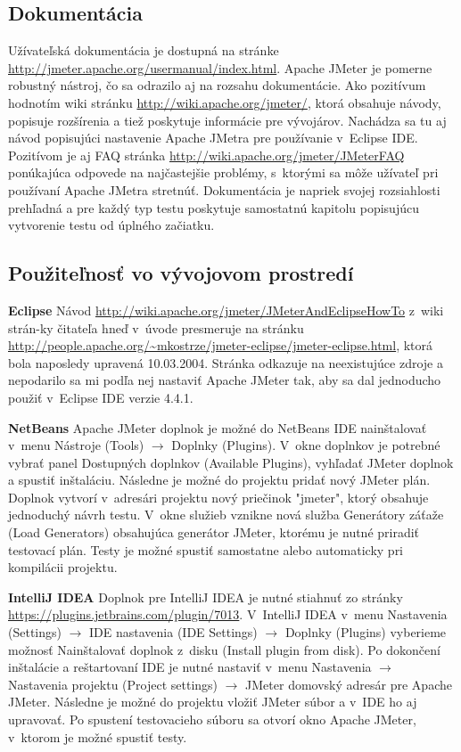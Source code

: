 \documentclass[12pt,oneside,final]{fithesis-utf8}
\begin{document}
\subsection{Dokumentácia}
Užívateľská dokumentácia je dostupná na stránke \url{http://jmeter.apache.org/usermanual/index.html}. Apache JMeter je pomerne robustný nástroj, čo sa odrazilo aj na rozsahu dokumentácie. Ako pozitívum hodnotím wiki stránku \url{http://wiki.apache.org/jmeter/}, ktorá obsahuje návody, popisuje rozšírenia a tiež poskytuje informácie pre vývojárov. Nachádza sa tu aj návod popisujúci nastavenie Apache JMetra pre používanie v~Eclipse IDE. Pozitívom je aj FAQ stránka \url{http://wiki.apache.org/jmeter/JMeterFAQ} ponúkajúca odpovede na najčastejšie problémy, s~ktorými  sa môže užívateľ pri používaní Apache JMetra stretnúť. Dokumentácia je napriek svojej rozsiahlosti prehľadná a pre každý typ testu poskytuje samostatnú kapitolu popisujúcu vytvorenie testu od úplného začiatku.

\subsection{Použiteľnosť vo vývojovom prostredí}
\textbf{Eclipse}
\newline
Návod \url{http://wiki.apache.org/jmeter/JMeterAndEclipseHowTo} z~wiki strán-ky čitateľa hneď v~úvode presmeruje na stránku \url{http://people.apache.org/~mkostrze/jmeter-eclipse/jmeter-eclipse.html}, ktorá bola naposledy upravená 10.03.2004. Stránka odkazuje na neexistujúce zdroje a nepodarilo sa mi podľa nej nastaviť Apache JMeter tak, aby sa dal jednoducho použiť v~Eclipse IDE verzie 4.4.1.
\newline

\noindent\textbf{NetBeans}
\newline
Apache JMeter doplnok je možné do NetBeans IDE nainštalovať v~menu Nástroje (Tools) $\rightarrow$ Doplnky (Plugins). V~okne doplnkov je potrebné vybrať panel Dostupných doplnkov (Available Plugins), vyhľadať JMeter doplnok a spustiť inštaláciu. Následne je možné do projektu pridať nový JMeter plán. Doplnok vytvorí v~adresári projektu nový priečinok "jmeter", ktorý obsahuje jednoduchý návrh testu. V~okne služieb vznikne nová služba Generátory záťaže (Load Generators) obsahujúca generátor JMeter, ktorému je nutné priradiť testovací plán. Testy je možné spustiť samostatne alebo automaticky pri kompilácii projektu.
\newline

\noindent\textbf{IntelliJ IDEA}
\newline
Doplnok pre IntelliJ IDEA je nutné stiahnuť zo stránky \url{https://plugins.jetbrains.com/plugin/7013}.  V~IntelliJ IDEA v~menu Nastavenia (Settings) $\rightarrow$ IDE nastavenia (IDE Settings) $\rightarrow$ Doplnky (Plugins) vyberieme možnosť Nainštalovať doplnok z~disku (Install plugin from disk). Po dokončení inštalácie a reštartovaní IDE je nutné nastaviť v~menu Nastavenia $\rightarrow$ Nastavenia projektu (Project settings) $\rightarrow$ JMeter domovský adresár pre Apache JMeter. Následne je možné do projektu vložiť JMeter súbor a v~IDE ho aj upravovať. Po spustení testovacieho súboru sa otvorí okno Apache JMeter, v~ktorom je možné spustiť testy.
\newline
\end{document}
